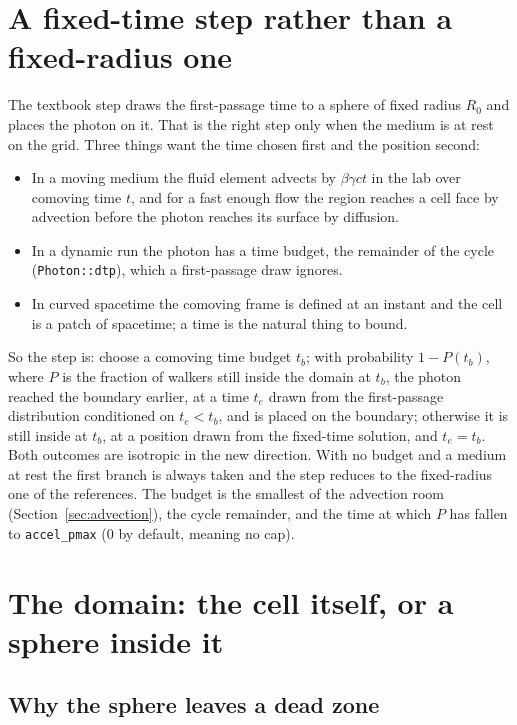 \documentclass[11pt]{article}
\newcommand{\key}[1]{\texttt{#1}}
\begin{document}
\section{A fixed-time step rather than a fixed-radius one}
\label{sec:fixedtime}

The textbook step draws the first-passage time to a sphere of fixed radius $R_0$ and
places the photon on it.  That is the right step only when the medium is at rest on the
grid.  Three things want the time chosen first and the position second:
\begin{itemize}
\item In a moving medium the fluid element advects by $\beta\gamma ct$ in the lab over
  comoving time $t$, and for a fast enough flow the region reaches a cell face by
  advection before the photon reaches its surface by diffusion.
\item In a dynamic run the photon has a time budget, the remainder of the cycle
  (\texttt{Photon::dtp}), which a first-passage draw ignores.
\item In curved spacetime the comoving frame is defined at an instant and the cell is
  a patch of spacetime; a time is the natural thing to bound.
\end{itemize}
So the step is: choose a comoving time budget $t_b$; with probability $1-P(t_b)$, where
$P$ is the fraction of walkers still inside the domain at $t_b$, the photon reached the
boundary earlier, at a time $t_e$ drawn from the first-passage distribution conditioned
on $t_e<t_b$, and is placed on the boundary; otherwise it is still inside at $t_b$, at a
position drawn from the fixed-time solution, and $t_e=t_b$.  Both outcomes are isotropic
in the new direction.  With no budget and a medium at rest the first branch is always
taken and the step reduces to the fixed-radius one of the references.  The budget is the
smallest of the advection room (Section~\ref{sec:advection}), the cycle remainder, and
the time at which $P$ has fallen to \key{accel\_pmax} (0 by default, meaning no cap).

\section{The domain: the cell itself, or a sphere inside it}
\label{sec:domain}

\subsection{Why the sphere leaves a dead zone}
\end{document}
